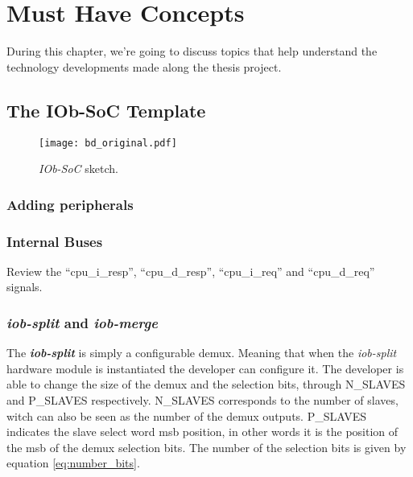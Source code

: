 \chapter{Must Have Concepts}
\label{chapter:must_have_concepts}
During this chapter, we're going to discuss topics that help understand the technology developments made along the thesis project.

\section{The IOb-SoC Template}
\label{section:the_iob_soc_template}

\begin{figure}[!h]
    \centering
    \texttt{[image: bd\_original.pdf]}
    \caption{\textit{IOb-SoC} sketch.}
    \label{fig:bd_original}
\end{figure}

\subsection{Adding peripherals}
\subsection{Internal Buses}
Review the \enquote{cpu\_i\_resp}, \enquote{cpu\_d\_resp}, \enquote{cpu\_i\_req} and \enquote{cpu\_d\_req} signals.

\subsection{\textit{iob-split} and \textit{iob-merge}}
The \textbf{\textit{iob-split}} is simply a configurable \acrfull{demux}. Meaning that when the \textit{iob-split} hardware module is instantiated the developer can configure it. The developer is able to change the size of the \acrlong{demux} and the selection bits, through N\_SLAVES and P\_SLAVES respectively. N\_SLAVES corresponds to the number of slaves, witch can also be seen as the number of the \acrshort{demux} outputs. P\_SLAVES indicates the slave select word \acrfull{msb} position, in other words it is the position of the \acrshort{msb} of the \acrlong{demux} selection bits. The number of the selection bits is given by equation \ref{eq:number_bits}.

